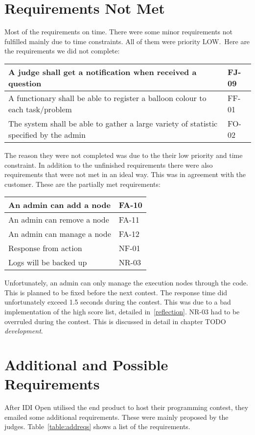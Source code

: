 \section{Requirements Not Met}\label{section:reqNotMet}
Most of the requirements on time.
There were some minor requirements not fulfilled mainly due to time
constraints. All of them were priority LOW.\ Here are the requirements
we did not complete:

\begin{center}
\begin{longtable}{|p{5cm}|l|}
\hline
A judge shall get a notification when received a question & FJ-09\\\hline
A functionary shall be able to register a balloon colour to each task/problem &
FF-01\\\hline
The system shall be able to gather a large variety of statistic specified by
the admin & FO-02\\\hline
\end{longtable}
\end{center}

The reason they were not completed was due to the their low priority and
time constraint. In addition to the unfinished requirements there were also 
requirements that were not met in an ideal way.
This was in agreement with the customer. These are the partially met
requirements:

\begin{longtable}{|l|l|}
    \hline
    An admin can add a node & FA-10 \\
    \hline
    An admin can remove a node & FA-11 \\
    \hline
    An admin can manage a node & FA-12 \\
    \hline
    Response from action & NF-01 \\
    \hline
    Logs will be backed up & NR-03 \\
    \hline
\end{longtable}

Unfortunately, an admin can only manage the execution nodes through the
code. This is planned to be fixed before the next contest. The response
time did unfortunately exceed 1.5 seconds during the contest. This was
due to a bad implementation of the high score list, detailed
in~\ref{reflection}. NR-03 had to be overruled during the contest. This is
discussed in detail in chapter TODO
\textit{development}.

\section{Additional and Possible Requirements}
After IDI Open utilised the end product to host their programming contest, they
emailed some additional requirements. These were mainly proposed by the judges.
Table~\ref{table:addreqs} shows a list of the requirements.

